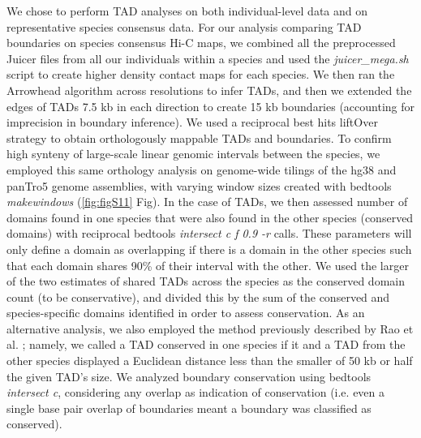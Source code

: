 We chose to perform TAD analyses on both individual-level data and on representative species consensus data. For our analysis comparing TAD boundaries on species consensus Hi-C maps, we combined all the preprocessed Juicer files from all our individuals within a species and used the \textit{juicer\_mega.sh} script \cite{Durand.2016} to create higher density contact maps for each species. We then ran the Arrowhead algorithm across resolutions to infer TADs, and then we extended the edges of TADs 7.5 kb in each direction to create 15 kb boundaries (accounting for imprecision in boundary inference). We used a reciprocal best hits liftOver strategy \cite{Ward.2014, Kent.2002} to obtain orthologously mappable TADs and boundaries. To confirm high synteny of large-scale linear genomic intervals between the species, we employed this same orthology analysis on genome-wide tilings of the hg38 and panTro5 genome assemblies, with varying window sizes created with bedtools \cite{Quinlan.2010} \textit{makewindows} (\ref{fig:figS11} Fig). In the case of TADs, we then assessed number of domains found in one species that were also found in the other species (conserved domains) with reciprocal bedtools \cite{Quinlan.2010} \textit{intersect {\textendash}c {\textendash}f 0.9 -r} calls. These parameters will only define a domain as overlapping if there is a domain in the other species such that each domain shares 90\% of their interval with the other. We used the larger of the two estimates of shared TADs across the species as the conserved domain count (to be conservative), and divided this by the sum of the conserved and species-specific domains identified in order to assess conservation. As an alternative analysis, we also employed the method previously described by Rao et al. \cite{Rao.2014}; namely, we called a TAD conserved in one species if it and a TAD from the other species displayed a Euclidean distance less than the smaller of 50 kb or half the given TAD's size. We analyzed boundary conservation using bedtools \textit{intersect {\textendash}c}, considering any overlap as indication of conservation (i.e. even a single base pair overlap of boundaries meant a boundary was classified as conserved).

